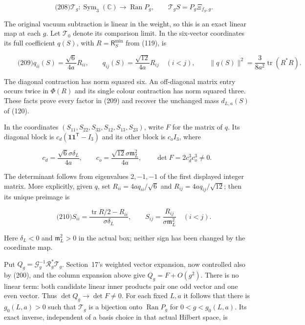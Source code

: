 \[
\qquad\text{(208)}
 \mathcal T_g:\operatorname{Sym}_3(\mathbb C)\longrightarrow
       \operatorname{Ran}P_g,\qquad
 \mathcal T_gS=P_g\Xi_{f_S,g}.
\]

The original vacuum subtraction is linear in the weight, so this is an
exact linear map at each \(g\). Let \(\mathcal T_0\) denote its
comparison limit. In the six-vector coordinates its full coefficient
\(q(S)\), with \(R=\mathsf R_S^{\min}\) from (119), is

\[
\qquad\text{(209)}
 q_{ii}(S)=\frac{\sqrt6}{4a}R_{ii},\qquad
 q_{ij}(S)=\frac{\sqrt{12}}{4a}R_{ij}\quad(i<j),\qquad
 \|q(S)\|^2=\frac3{8a^2}\operatorname{tr}(R^*R).
\]

The diagonal contraction has norm squared six. An off-diagonal matrix
entry occurs twice in \(\Phi(R)\) and its single colour contraction has
norm squared three. These facts prove every factor in (209) and recover
the unchanged mass \(d_{L,a}(S)\) of (120).

In the coordinates \((S_{11},S_{22},S_{33},S_{12},S_{13},S_{23})\),
write \(F\) for the matrix of \(q\). Its diagonal block is
\(c_d(\boldsymbol 1\boldsymbol 1^{\mathsf T}-I_3)\) and its other block
is \(c_oI_3\), where

\[
c_d=\frac{\sqrt6\sigma\delta_L}{4a},\qquad
 c_o=\frac{\sqrt{12}\sigma\mathfrak m_L^2}{4a},\qquad
 \det F=2c_d^3c_o^3\ne0.
\]

The determinant follows from eigenvalues \(2,-1,-1\) of the first
displayed integer matrix. More explicitly, given \(q\), set
\(R_{ii}=4a q_{ii}/\sqrt6\) and \(R_{ij}=4a q_{ij}/\sqrt{12}\); then its
unique preimage is

\[
\qquad\text{(210)}
 S_{ii}=\frac{\operatorname{tr}R/2-R_{ii}}{\sigma\delta_L},
 \qquad S_{ij}=\frac{R_{ij}}{\sigma\mathfrak m_L^2}\quad(i<j).
\]

Here \(\delta_L<0\) and \(\mathfrak m_L^2>0\) in the actual box; neither
sign has been changed by the coordinate map.

Put \(Q_g=\mathcal G_g^{-1}\mathcal R_g^*\mathcal T_g\). Section~17's
weighted vector expansion, now controlled also by (200), and the column
expansion above give \(Q_g=F+O(g^2)\). There is no linear term: both
candidate linear inner products pair one odd vector and one even vector.
Thus \(\det Q_g\to\det F\ne0\). For each fixed \(L,a\) it follows that
there is \(g_0(L,a)>0\) such that \(\mathcal T_g\) is a bijection onto
\(\operatorname{Ran}P_g\) for \(0<g<g_0(L,a)\). Its exact inverse,
independent of a basis choice in that actual Hilbert space, is

